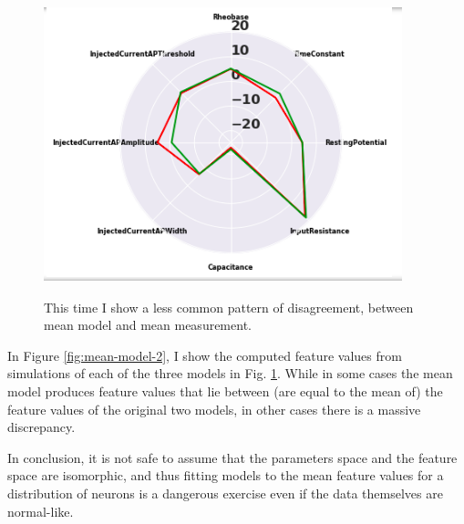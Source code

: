 \begin{figure}
    \centering
    \includegraphics{figures/model_differences2.png}
        \label{fig:mean-model-1}
    \caption[Second example of disparity in mean model, mean measurement agreement]{This time I show a less common pattern of disagreement, between mean model and mean measurement.}
\end{figure}



In Figure \ref{fig:mean-model-2}, I show the computed feature values from simulations of each of the three models in Fig. \ref{fig:mean-model-1}.
While in some cases the mean model produces feature values that lie between (are equal to the mean of) the feature values of the original two models, in other cases there is a massive discrepancy.

In conclusion, it is not safe to assume that the parameters space and the feature space are isomorphic, and thus fitting models to the mean feature values for a distribution of neurons is a dangerous exercise even if the data themselves are normal-like.


